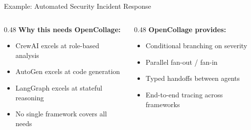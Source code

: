 \begin{frame}{\fontsize{10}{12}\selectfont Example: Automated Security Incident Response}
\begin{center}
  \end{center}

  \vspace{0.0cm}

  \fontsize{6}{7}\selectfont
  \begin{columns}[T]
    \begin{column}{0.48\textwidth}
      \textbf{Why this needs OpenCollage:}
      \begin{itemize}
        \item CrewAI excels at role-based analysis
        \item AutoGen excels at code generation
        \item LangGraph excels at stateful reasoning
        \item No single framework covers all needs
      \end{itemize}
    \end{column}
    \begin{column}{0.48\textwidth}
      \textbf{OpenCollage provides:}
      \begin{itemize}
        \item Conditional branching on severity
        \item Parallel fan-out / fan-in
        \item Typed handoffs between agents
        \item End-to-end tracing across frameworks
      \end{itemize}
    \end{column}
  \end{columns}
\end{frame}
